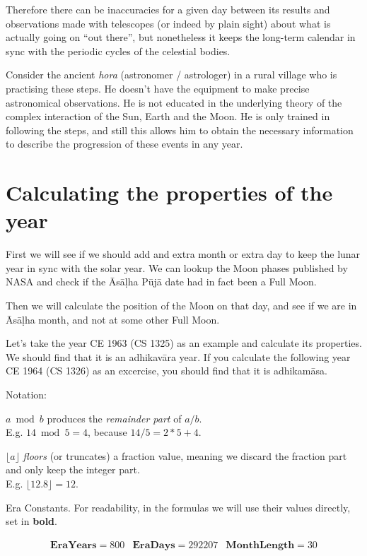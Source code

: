 \documentclass[11pt,oneside]{memoir-article}
\begin{document}
Therefore there can be inaccuracies for a given day between its results and
observations made with telescopes (or indeed by plain sight) about what is
actually going on ``out there'', but nonetheless it keeps the long-term calendar
in sync with the periodic cycles of the celestial bodies.

Consider the ancient \emph{hora}  (astronomer / astrologer) in a rural village who is
practising these steps. He doesn't have the equipment to make precise
astronomical observations. He is not educated in the underlying theory of the
complex interaction of the Sun, Earth and the Moon. He is only trained in
following the steps, and still this allows him to obtain the necessary
information to describe the progression of these events in any year.

\section{Calculating the properties of the year}
\label{sec-4-2}

First we will see if we should add and extra month or extra day to keep the
lunar year in sync with the solar year. We can lookup the Moon phases published
by NASA and check if the Āsāḷha Pūjā date had in fact been a Full Moon.

Then we will calculate the position of the Moon on that day, and see if we are
in Āsāḷha month, and not at some other Full Moon.

Let's take the year CE 1963 (CS 1325) as an example and calculate its
properties. We should find that it is an adhikavāra year. If you calculate the
following year CE 1964 (CS 1326) as an excercise, you should find that it is
adhikamāsa.

Notation:

$a \bmod b$ produces the \emph{remainder part} of $a/b$.\\
E.g. $14 \bmod 5 = 4$, because $14/5 = 2*5 + 4$.

$\lfloor a \rfloor$ \emph{floors} (or truncates) a fraction value, meaning we discard
the fraction part and only keep the integer part.\\
E.g. $\lfloor 12.8 \rfloor = 12$.


Era Constants. For readability, in the formulas we will use their values directly, set in \textbf{bold}.

\begin{align*}
  \mathbf{EraYears} = 800 & \mathbf{EraDays} = 292207 & \mathbf{MonthLength} = 30
\end{align*}
\end{document}
